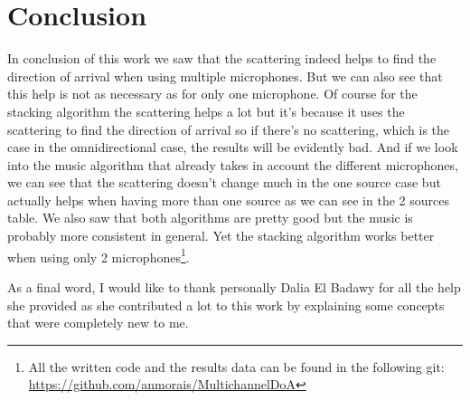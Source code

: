 \section{Conclusion}

In conclusion of this work we saw that the scattering indeed helps to find the direction of arrival when using multiple microphones. But we can also see that this help is not as necessary as for only one microphone. Of course for the stacking algorithm the scattering helps a lot but it's because it uses the scattering to find the direction of arrival so if there's no scattering, which is the case in the omnidirectional case, the results will be evidently bad. And if we look into the music algorithm that already takes in account the different microphones, we can see that the scattering doesn't change much in the one source case but actually helps when having more than one source as we can see in the 2 sources table. We also saw that both algorithms are pretty good but the music is probably more consistent in general. Yet the stacking algorithm works better when using only 2 microphones\footnote{All the written code and the results data can be found in the following git: \url{https://github.com/anmorais/MultichannelDoA}}.

As a final word, I would like to thank personally Dalia El Badawy for all the help she provided as she contributed a lot to this work by explaining some concepts that were completely new to me.